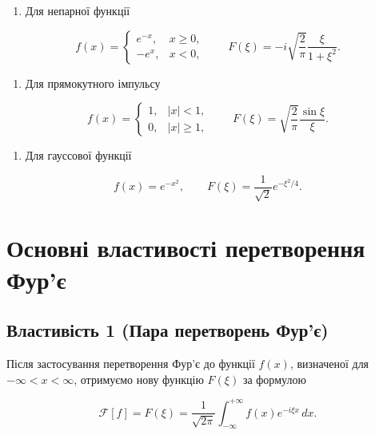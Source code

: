 \documentclass[
  ukrainian,
]{article}
\providecommand{\tightlist}{%
  \setlength{\itemsep}{0pt}\setlength{\parskip}{0pt}}
\begin{document}
\begin{enumerate}
\def\labelenumi{\arabic{enumi}.}
\tightlist
\item
  Для непарної функції
\end{enumerate}

\[
f(x)=
\begin{cases}
e^{-x}, & x\ge 0,\\
-e^{x}, & x<0,
\end{cases}
\qquad
F(\xi)=-i\sqrt{\frac{2}{\pi}}\frac{\xi}{1+\xi^2}.
\]

\begin{enumerate}
\def\labelenumi{\arabic{enumi}.}
\setcounter{enumi}{1}
\tightlist
\item
  Для прямокутного імпульсу
\end{enumerate}

\[
f(x)=
\begin{cases}
1, & |x|<1,\\
0, & |x|\ge 1,
\end{cases}
\qquad
F(\xi)=\sqrt{\frac{2}{\pi}}\frac{\sin\xi}{\xi}.
\]

\begin{enumerate}
\def\labelenumi{\arabic{enumi}.}
\setcounter{enumi}{2}
\tightlist
\item
  Для гауссової функції
\end{enumerate}

\[
f(x)=e^{-x^2},
\qquad
F(\xi)=\frac{1}{\sqrt{2}}e^{-\xi^2/4}.
\]

\section{Основні властивості перетворення
Фур'є}\label{ux43eux441ux43dux43eux432ux43dux456-ux432ux43bux430ux441ux442ux438ux432ux43eux441ux442ux456-ux43fux435ux440ux435ux442ux432ux43eux440ux435ux43dux43dux44f-ux444ux443ux440ux454}

\subsection{Властивість 1 (Пара перетворень
Фур'є)}\label{ux432ux43bux430ux441ux442ux438ux432ux456ux441ux442ux44c-1-ux43fux430ux440ux430-ux43fux435ux440ux435ux442ux432ux43eux440ux435ux43dux44c-ux444ux443ux440ux454}

Після застосування перетворення Фур'є до функції \(f(x)\), визначеної
для \(-\infty < x < \infty\), отримуємо нову функцію \(F(\xi)\) за
формулою

\[
\mathcal{F}[f] = F(\xi) = \frac{1}{\sqrt{2\pi}} \int_{-\infty}^{+\infty} f(x)e^{-i\xi x}\,dx.
\]
\end{document}
